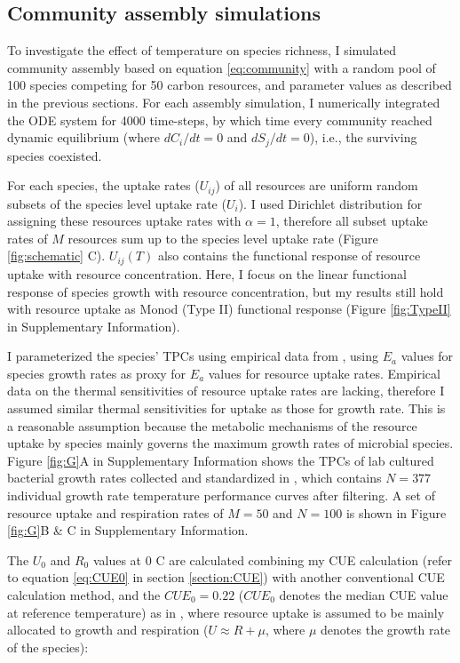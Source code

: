 \documentclass[11pt, a4paper]{article}
\begin{document}
\begin{spacing}{1.5}
\subsection{Community assembly simulations}

To investigate the effect of temperature on species richness, I simulated community assembly based on equation \ref{eq:community} with a random pool of 100 species competing for 50 carbon resources, and parameter values as described in the previous sections. For each assembly simulation, I numerically integrated the ODE system for 4000 time-steps, by which time every community reached dynamic equilibrium (where $dC_i/dt = 0$ and $dS_j/dt = 0$), i.e., the surviving species coexisted. 

For each species, the uptake rates ($U_{ij}$) of all resources are uniform random subsets of the species level uptake rate ($U_i$). I used Dirichlet distribution for assigning these resources uptake rates with $\alpha = 1$, therefore all subset uptake rates of $M$ resources sum up to the species level uptake rate (Figure \ref{fig:schematic} C). $U_{ij}(T)$ also contains the functional response of resource uptake with resource concentration. Here, I focus on the linear functional response of species growth with resource concentration, but my results still hold with resource uptake as Monod (Type II) functional response (Figure \ref{fig:TypeII} in Supplementary Information). 

I parameterized the species' TPCs using empirical data from \cite{smith2019community, smith2020systematic}, using $E_a$ values for species growth rates as proxy for $E_a$ values for resource uptake rates. Empirical data on the thermal sensitivities of resource uptake rates are lacking, therefore I assumed similar thermal sensitivities for uptake as those for growth rate. This is a reasonable assumption because the metabolic mechanisms of the resource uptake by species mainly governs the maximum growth rates of microbial species. Figure \ref{fig:G}A in Supplementary Information shows the TPCs of lab cultured bacterial growth rates collected and standardized in \cite{smith2019community}, which contains $N = 377$ individual growth rate temperature performance curves after filtering. A set of resource uptake and respiration rates of $M = 50$ and $N = 100$ is shown in Figure \ref{fig:G}B \& C in Supplementary Information.

The $U_0$ and $R_0$ values at 0 \textdegree C are calculated combining my CUE calculation (refer to equation \ref{eq:CUE0} in section \ref{section:CUE}) with another conventional CUE calculation method, and the $CUE_0 = 0.22$ ($CUE_0$ denotes the median CUE value at reference temperature) as in \cite{smith2020systematic}, where resource uptake is assumed to be mainly allocated to growth and respiration ($U \approx R + \mu$, where $\mu$ denotes the growth rate of the species):


\end{spacing}
\end{document}
